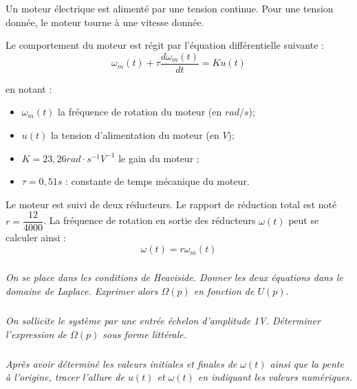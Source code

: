 \documentclass[11pt,oneside]{article}
\begin{document}
Un moteur électrique est alimenté par une tension continue. Pour une tension donnée, le moteur tourne à une vitesse donnée. 

Le comportement du moteur est régit par l'équation différentielle suivante : 
$$ 
\omega_m(t) + \tau \dfrac{d\omega_m(t)}{dt} = Ku(t)
$$

en notant :
\begin{itemize}
\item $\omega_m(t)$ la fréquence de rotation du moteur (en $rad/s$);
\item $u(t)$ la tension d'alimentation du moteur (en $V$);
\item $K= 23,26 rad\cdot s^{-1}V^{-1}$ le gain du moteur ;
\item $\tau = 0,51 s$ : constante de temps mécanique du moteur.
\end{itemize}

Le moteur est suivi de deux réducteurs. Le rapport de réduction total est noté $r=\dfrac{12}{4000}$. La fréquence de rotation en sortie des réducteurs $\omega(t)$ peut se calculer ainsi :
$$
\omega(t) = r \omega_m(t)
$$


\subparagraph{}
\textit{On se place dans les conditions de Heaviside. Donner les deux équations dans le domaine de Laplace. Exprimer alors $\Omega(p)$ en fonction de $U(p)$.}


\subparagraph{}
\textit{On sollicite le système par une entrée échelon d'amplitude 1V. Déterminer l'expression de $\Omega(p)$ sous forme littérale.}


\subparagraph{}
\textit{Après avoir déterminé les valeurs initiales et finales de $\omega(t)$ ainsi que la pente à l'origine, tracer l'allure de $u(t)$ et $\omega(t)$ en indiquant les valeurs numériques.}

\end{document}
